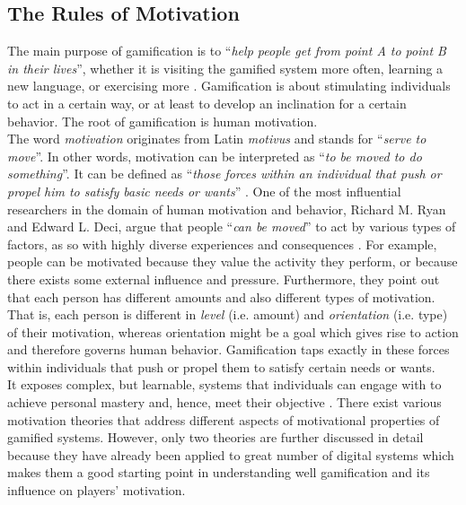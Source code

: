 \subsection{The Rules of Motivation}
The main purpose of gamification is to ``\textit{help people get from point A to point B in their lives}'', whether it is visiting the gamified system more often, learning a new language, or exercising more \cite{gamificationPurpose}. Gamification is about stimulating individuals to act in a certain way, or at least to develop an inclination for a certain behavior. The root of gamification is human motivation.\\The word \textit{motivation} originates from Latin \textit{motivus} and stands for ``\textit{serve to move}''. In other words, motivation can be interpreted as ``\textit{to be moved to do something}''\cite{ryan2000intrinsic}. It can be defined as ``\textit{those forces within an individual that push or propel him to satisfy basic needs or wants}'' \cite{pardee1990motivation}. One of the most influential researchers in the domain of human motivation and behavior, Richard M. Ryan and Edward L. Deci, argue that people ``\textit{can be moved}'' to act by various types of factors, as so with highly diverse experiences and consequences \cite{ryan2000intrinsic}. For example, people can be motivated because they value the activity they perform, or because there exists some external influence and pressure. Furthermore, they point out that each person has different amounts and also different types of motivation. That is, each person is different in \textit{level} (i.e. amount) and \textit{orientation} (i.e. type) of their motivation, whereas orientation might be a goal which gives rise to action and therefore governs human behavior. Gamification taps exactly in these forces within individuals that push or propel them to satisfy certain needs or wants. \\It exposes complex, but learnable, systems that individuals can engage with to achieve personal mastery and, hence, meet their objective \cite{gamificationPurpose}. There exist various motivation theories that address different aspects of motivational properties of gamified systems. However, only two theories are further discussed in detail because they have already been applied to great number of digital systems which makes them a good starting point in understanding well gamification and its influence on players' motivation.

